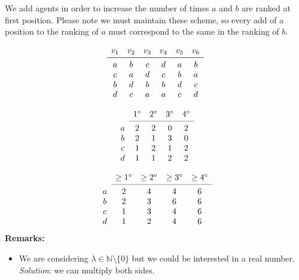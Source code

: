 We add agents in order to increase the number of times $a$ and $b$ are ranked at first position. Please note we must maintain these scheme, so every add of a position to the ranking of $a$ must correspond to the same in the ranking of $b$.

\[
\begin{array}{cccccc}
v_1
& v_2
& v_3 
& v_4
& v_5
& v_6 \\
\midrule 
a
& b
& c 
& d
& a
& b \\
c
& a
& d
& c
& b
& a \\
b
& d
& b
& b
& d
& c \\
d
& c
& a
& a
& c
& d \\
\end{array}
\]

\[
\begin{array}{ccccc}
& 1^\circ
& 2^\circ
& 3^\circ
& 4^\circ \\
\cmidrule{2-5}
a 
& 2
& 2
& 0
& 2 \\
b
& 2
& 1
& 3
& 0 \\
c
& 1
& 2
& 1
& 2 \\
d
& 1
& 1
& 2
& 2 \\
\end{array}
\]

\[
\begin{array}{ccccc}
& \geq 1^\circ
& \geq 2^\circ
& \geq 3^\circ
& \geq 4^\circ \\
\cmidrule{2-5}
a 
& 2
& 4
& 4
& 6 \\
b
& 2
& 3
& 6
& 6 \\
c
& 1
& 3
& 4
& 6 \\
d
& 1
& 2
& 4
& 6 \\
\end{array}
\]
\textbf{Remarks:}
\begin{itemize}
	\item We are considering $\lambda \in \mathbb{N} \setminus \{0\}$ but we could be interested in a real number. \textit{Solution}: we can multiply both sides.
\end{itemize}
\fi
  
